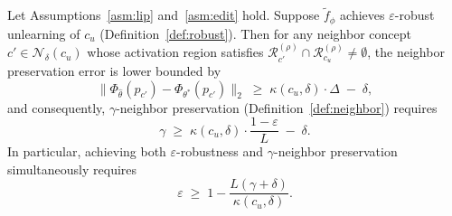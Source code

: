 \begin{theorem}
\label{thm:tradeoff}
Let Assumptions~\ref{asm:lip} and~\ref{asm:edit} hold. Suppose
$\tilde{f}_\phi$ achieves $\varepsilon$-robust unlearning of $c_u$
(Definition~\ref{def:robust}). Then for any neighbor concept
$c' \in \mathcal{N}_\delta(c_u)$ whose activation region satisfies
$\mathcal{R}_{c'}^{(\rho)} \cap \mathcal{R}_{c_u}^{(\rho)} \neq
\emptyset$, the neighbor preservation error is lower bounded by
\[
    \bigl\|\Phi_{\hat\theta}(p_{c'}) -
    \Phi_{\theta^*}(p_{c'})\bigr\|_2
    \;\geq\;
    \kappa(c_u,\delta) \cdot \Delta
    \;-\; \delta,
\]
and consequently, $\gamma$-neighbor preservation
(Definition~\ref{def:neighbor}) requires
\[
    \boxed{
    \gamma \;\geq\; \kappa(c_u,\delta)\cdot\frac{1-\varepsilon}{L}
    \;-\; \delta.
    }
\]
In particular, achieving both $\varepsilon$-robustness and
$\gamma$-neighbor preservation simultaneously requires
\[
    \varepsilon \;\geq\; 1 - \frac{L(\gamma + \delta)}{\kappa(c_u,\delta)}.
\]
\end{theorem}

